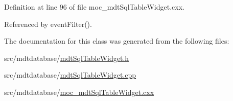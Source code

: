 Definition at line 96 of file moc\-\_\-mdt\-Sql\-Table\-Widget.\-cxx.



Referenced by event\-Filter().



The documentation for this class was generated from the following files\-:\begin{DoxyCompactItemize}
\item 
src/mdtdatabase/\hyperlink{mdt_sql_table_widget_8h}{mdt\-Sql\-Table\-Widget.\-h}\item 
src/mdtdatabase/\hyperlink{mdt_sql_table_widget_8cpp}{mdt\-Sql\-Table\-Widget.\-cpp}\item 
src/mdtdatabase/\hyperlink{moc__mdt_sql_table_widget_8cxx}{moc\-\_\-mdt\-Sql\-Table\-Widget.\-cxx}\end{DoxyCompactItemize}
